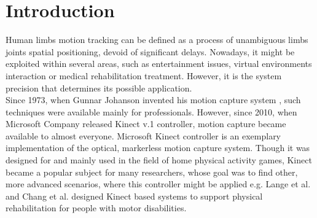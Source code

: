 \documentclass[sensors,article,submit,moreauthors,pdftex,10pt,a4paper]{mdpi}
\begin{document}


\section{Introduction}

Human limbs motion tracking can be defined as a process of unambiguous limbs joints spatial positioning, devoid of significant delays. Nowadays, it might be exploited within several areas, such as entertainment issues, virtual environments interaction or medical rehabilitation treatment. However, it is the system precision that determines its possible application. \\
Since 1973, when Gunnar Johanson invented his motion capture system \cite{Johansson1973}, such techniques were available mainly for professionals. However, since 2010, when Microsoft Company released Kinect v.1 controller, motion capture became available to almost everyone. Microsoft Kinect controller is an exemplary implementation of the optical, markerless motion capture system. Though it was designed for and mainly used in the field of home physical activity games, Kinect became a popular subject for many researchers, whose goal was to find other, more advanced scenarios, where this controller might be applied e.g. Lange et al. \cite{Lange2012} and Chang et al.\cite{Chang2011} designed Kinect based systems to support physical rehabilitation for people with motor disabilities.
\end{document}
